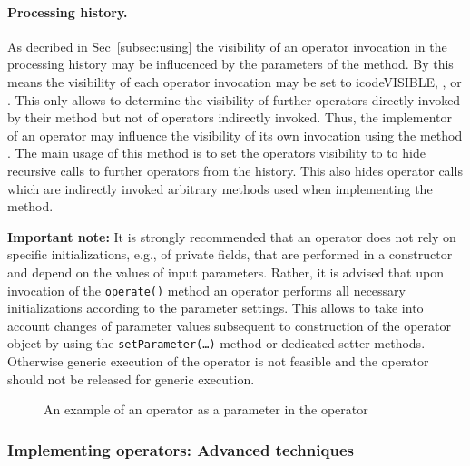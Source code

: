 \paragraph{Processing history.}
As decribed in Sec~\ref{subsec:using} the visibility of an operator invocation in the
processing history may be
influcenced by the parameters of the   method.
By this means the visibility of each operator invocation may be set to
icode{VISIBLE}, , or .
This only allows to determine the visibility of further operators directly
invoked by their  method but not of operators indirectly invoked.
Thus, the implementor of an operator may influence the visibility
of its own invocation using the method .
The main usage of this method is to set the operators visibility to 
to hide recursive calls to further operators from the history.
This also hides operator calls which are indirectly invoked arbitrary methods used when implementing
the  method.

\textbf{Important note:} It is strongly recommended that an operator
does not rely on specific initializations, e.g., of private fields, that are
performed in a constructor and depend on the values of input parameters. Rather,
it is advised that upon invocation of the \texttt{operate()} method an operator performs all necessary initializations according to the parameter settings.
This allows to take into account changes of parameter values subsequent to
construction of the operator object by using the \texttt{setParameter(\ldots)}
method or dedicated setter methods.
Otherwise generic execution of the operator is not feasible and
the operator should not be released for generic execution.

\begin{figure}[tb]

\caption{\label{exa:operatorAsParameter}An example of an operator as a parameter in the operator }
\end{figure}

\subsubsection{Implementing operators: Advanced techniques}
\label{subsubsec:implOperators-advanced}

